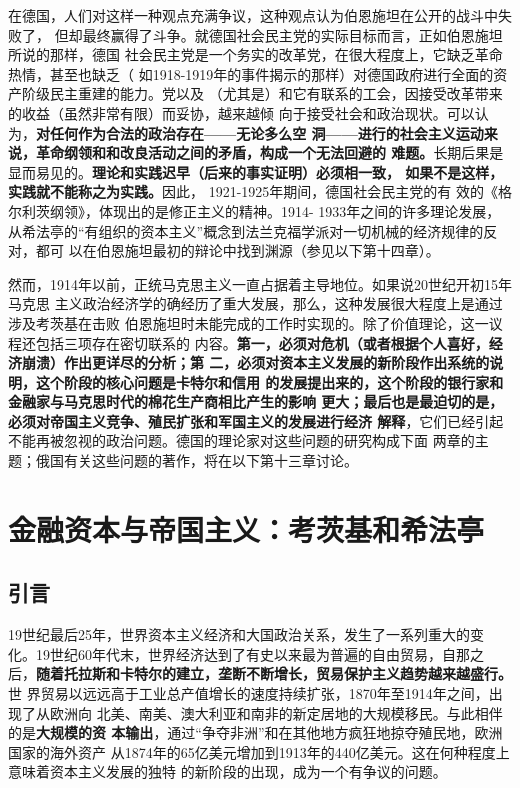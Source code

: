 在德国，人们对这样一种观点充满争议，这种观点认为伯恩施坦在公开的战斗中失败了，
但却最终赢得了斗争。就德国社会民主党的实际目标而言，正如伯恩施坦所说的那样，德国
社会民主党是一个务实的改革党，在很大程度上，它缺乏革命热情，甚至也缺乏（
如1918-1919年的事件揭示的那样）对德国政府进行全面的资产阶级民主重建的能力。党以及
（尤其是）和它有联系的工会，因接受改革带来的收益（虽然非常有限）而妥协，越来越倾
向于接受社会和政治现状。可以认为，\textbf{对任何作为合法的政治存在——无论多么空
  洞——进行的社会主义运动来说，革命纲领和和改良活动之间的矛盾，构成一个无法回避的
  难题。}长期后果是显而易见的。\textbf{理论和实践迟早（后来的事实证明）必须相一致，
  如果不是这样，实践就不能称之为实践。}因此， 1921-1925年期间，德国社会民主党的有
效的《格尔利茨纲领》，体现出的是修正主义的精神。1914- 1933年之间的许多理论发展，
从希法亭的“有组织的资本主义”概念到法兰克福学派对一切机械的经济规律的反对，都可
以在伯恩施坦最初的辩论中找到渊源（参见以下第十四章）。

然而，1914年以前，正统马克思主义一直占据着主导地位。如果说20世纪开初15年马克思
主义政治经济学的确经历了重大发展，那么，这种发展很大程度上是通过涉及考茨基在击败
伯恩施坦时未能完成的工作时实现的。除了价值理论，这一议程还包括三项存在密切联系的
内容。\textbf{第一，必须对危机（或者根据个人喜好，经济崩溃）作出更详尽的分析；第
  二，必须对资本主义发展的新阶段作出系统的说明，这个阶段的核心问题是卡特尔和信用
  的发展提出来的，这个阶段的银行家和金融家与马克思时代的棉花生产商相比产生的影响
  更大；最后也是最迫切的是，必须对帝国主义竞争、殖民扩张和军国主义的发展进行经济
  解释}，它们已经引起不能再被忽视的政治问题。德国的理论家对这些问题的研究构成下面
两章的主题；俄国有关这些问题的著作，将在以下第十三章讨论。

\chapter{金融资本与帝国主义：考茨基和希法亭}

\section{引言}
19世纪最后25年，世界资本主义经济和大国政治关系，发生了一系列重大的变
化。19世纪60年代末，世界经济达到了有史以来最为普遍的自由贸易，自那之
后，\textbf{随着托拉斯和卡特尔的建立，垄断不断增长，贸易保护主义趋势越来越盛行。}世
界贸易以远远高于工业总产值增长的速度持续扩张，1870年至1914年之间，出现了从欧洲向
北美、南美、澳大利亚和南非的新定居地的大规模移民。与此相伴的是\textbf{大规模的资
  本输出}，通过“争夺非洲”和在其他地方疯狂地掠夺殖民地，欧洲国家的海外资产
从1874年的65亿美元增加到1913年的440亿美元。这在何种程度上意味着资本主义发展的独特
的新阶段的出现，成为一个有争议的问题。

